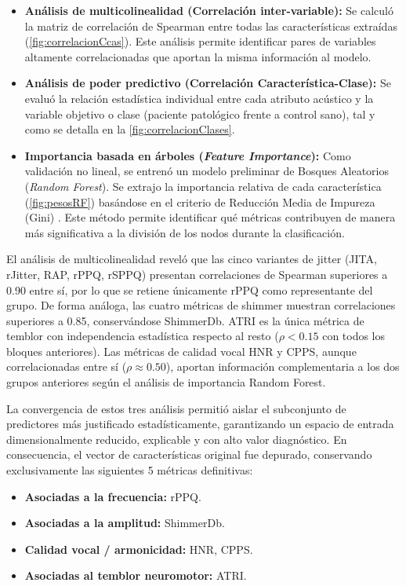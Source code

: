             \begin{itemize}
                \item \textbf{Análisis de multicolinealidad (Correlación inter-variable):} Se calculó la matriz de correlación de Spearman entre todas las características extraídas (\autoref{fig:correlacionCcas}). Este análisis permite identificar pares de variables altamente correlacionadas que aportan la misma información al modelo.
                
                \item \textbf{Análisis de poder predictivo (Correlación Característica-Clase):} Se evaluó la relación estadística individual entre cada atributo acústico y la variable objetivo o clase (paciente patológico frente a control sano), tal y como se detalla en la \autoref{fig:correlacionClases}.
                
                \item \textbf{Importancia basada en árboles (\textit{Feature Importance}):} Como validación no lineal, se entrenó un modelo preliminar de Bosques Aleatorios (\textit{Random Forest}). Se extrajo la importancia relativa de cada característica (\autoref{fig:pesosRF}) basándose en el criterio de Reducción Media de Impureza (Gini) \cite{breiman2001}. Este método permite identificar qué métricas contribuyen de manera más significativa a la división de los nodos durante la clasificación.
                
            \end{itemize}

            El análisis de multicolinealidad reveló que las cinco variantes de jitter (JITA, rJitter, RAP, rPPQ, rSPPQ) presentan correlaciones de Spearman superiores a 0.90 entre sí, por lo que se retiene únicamente rPPQ como representante del grupo. De forma análoga, las cuatro métricas de shimmer muestran correlaciones superiores a 0.85, conservándose ShimmerDb. ATRI es la única métrica de temblor con independencia estadística respecto al resto ($\rho < 0.15$ con todos los bloques anteriores). Las métricas de calidad vocal HNR y CPPS, aunque correlacionadas entre sí ($\rho \approx 0.50$), aportan información complementaria a los dos grupos anteriores según el análisis de importancia Random Forest.

            La convergencia de estos tres análisis permitió aislar el subconjunto de predictores más justificado estadísticamente, garantizando un espacio de entrada dimensionalmente reducido, explicable y con alto valor diagnóstico. En consecuencia, el vector de características original fue depurado, conservando exclusivamente las siguientes 5 métricas definitivas:
            \\
            \begin{itemize}
                \item \textbf{Asociadas a la frecuencia:} rPPQ.
                \item \textbf{Asociadas a la amplitud:} ShimmerDb.
                \item \textbf{Calidad vocal / armonicidad:} HNR, CPPS.
                \item \textbf{Asociadas al temblor neuromotor:} ATRI.
            \end{itemize}

